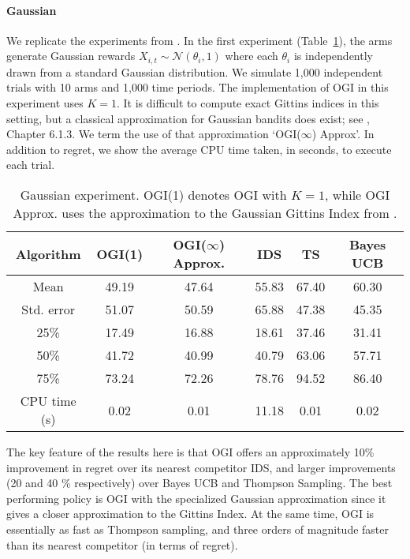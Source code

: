 \paragraph{Gaussian}We replicate the experiments from \cite{russo2014learning}. In the first experiment (Table~\ref{table:gaussian_experiment1}), the arms generate Gaussian rewards  $X_{i,t} \sim \mathcal{N}(\theta_i, 1)$ where each $\theta_i$ is independently drawn from a standard Gaussian distribution. We simulate 1,000 independent trials with 10 arms and 1,000 time periods. The implementation of OGI in this experiment uses $K = 1$. It is difficult to compute exact Gittins indices in this setting, but a classical approximation for Gaussian bandits does exist; see \cite{powell2012optimal}, Chapter 6.1.3. We term the use of that approximation `OGI($\infty$) Approx'.  In addition to regret, we  show the average CPU time taken, in seconds, to execute each trial.

\begin{table}[h!]
	\centering
	\begin{tabular}{cccccc} \toprule
		\textbf{Algorithm}  & \textbf{OGI(1)} & \textbf{OGI($\infty$) Approx.} & \textbf{IDS} & \textbf{TS} & \textbf{Bayes UCB}\\ \midrule
		Mean   & 49.19 & 47.64  &  55.83 & 67.40 & 60.30  \\ 
		Std. error  & 51.07 & 50.59 & 65.88 & 47.38 & 45.35 \\ 
		25\%  & 17.49 & 16.88  & 18.61 & 37.46 & 31.41 \\
		50\%   & 41.72 & 40.99 & 40.79 & 63.06 & 57.71 \\ 
		75\%  & 73.24 & 72.26 & 78.76 & 94.52 & 86.40 \\ 
		CPU time (s) & 0.02 & 0.01 & 11.18 & 0.01 & 0.02 \\
		\bottomrule
	\end{tabular}
	\caption[Table caption text]{Gaussian experiment. OGI(1) denotes OGI with $K =1$, while OGI Approx. uses the approximation to the Gaussian Gittins Index from \cite{powell2012optimal}.}
	\label{table:gaussian_experiment1}
\end{table}

The key feature of the results here is that OGI offers an approximately 10\% improvement in regret over its nearest competitor IDS, and larger improvements (20 and 40 \% respectively) over Bayes UCB and Thompson Sampling. The best performing policy is OGI with the specialized Gaussian approximation since it gives a closer approximation to the Gittins Index. At the same time, OGI is essentially as fast as Thompson sampling, and three orders of magnitude faster than its nearest competitor (in terms of regret). 


